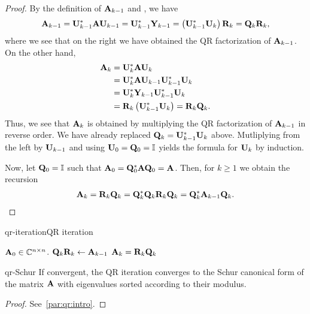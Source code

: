 \begin{proof}
  By the definition of $\mathbf A_{k-1}$ and
  , we have
  \begin{gather*}
    \mathbf A_{k-1} = \mathbf U_{k-1}^*\mathbf A\mathbf U_{k-1}
    = \mathbf U_{k-1}^* \mathbf Y_{k-1}
    = \left(\mathbf U_{k-1}^*\mathbf U_{k}\right)\mathbf R_k = \mathbf Q_k\mathbf R_k,
  \end{gather*}
  where we see that on the right we have obtained the QR factorization of $\mathbf A_{k-1}$.
  On the other hand,
  \begin{align*}
    \mathbf A_k
    &= \mathbf U_k^*\mathbf A\mathbf U_k\\
    &= \mathbf U_k^*\mathbf A\mathbf U_{k-1}\mathbf U_{k-1}^*\mathbf U_k\\
    &= \mathbf U_k^*\mathbf Y_{k-1} \mathbf U_{k-1}^*\mathbf U_k\\
    &= \mathbf R_k \left(\mathbf U_{k-1}^*\mathbf U_k\right) = \mathbf R_k\mathbf Q_k.
  \end{align*}
  Thus, we see that $\mathbf A_k$ is obtained by multiplying the QR
  factorization of $\mathbf A_{k-1}$ in reverse order.  We have already
  replaced $\mathbf Q_k = \mathbf U_{k-1}^*\mathbf U_k$ above. Mutliplying from
  the left by $\mathbf U_{k-1}$ and using $\mathbf U_0=\mathbf Q_0=\mathbb I$ yields the
  formula for $\mathbf U_k$ by induction.

  Now, let $\mathbf Q_0=\mathbb I$ such that
  $\mathbf A_0 = \mathbf Q_0^*\mathbf A\mathbf Q_0=\mathbf A$. Then, for $k\ge 1$ we
  obtain the recursion
  \begin{gather}
    \mathbf A_{k} = \mathbf R_k\mathbf Q_k = \mathbf Q_k^* \mathbf Q_k \mathbf R_k \mathbf Q_k = \mathbf Q_k^* \mathbf A_{k-1} \mathbf Q_k.
  \end{gather}
\end{proof}

\begin{Algorithm*}{qr-iteration}{QR iteration}
  \begin{algorithmic}[1]
    \Require $\mathbf A_0\in\mathbb C^{n\times n}$.
    \State $\mathbf Q_k\mathbf R_k \gets \mathbf A_{k-1}$ 
    \State $\mathbf A_{k} = \mathbf R_k\mathbf Q_k$
    \EndFor
  \end{algorithmic}
\end{Algorithm*}

\begin{Lemma}{qr-Schur}
  If convergent, the QR iteration converges to the Schur canonical
  form of the matrix $\mathbf A$ with eigenvalues sorted according to
  their modulus.
\end{Lemma}

\begin{proof}
  See~\ref{par:qr:intro}.
\end{proof}

